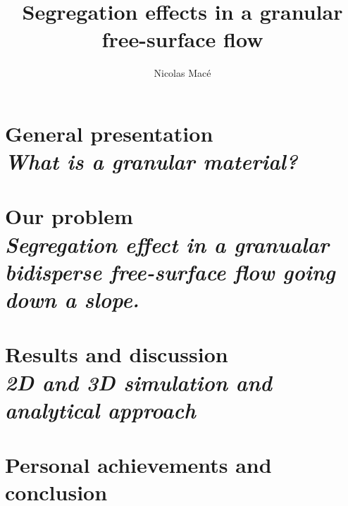 \documentclass[11pt,a4paper]{report}
\author{Nicolas Macé}
\title{Segregation effects in a granular free-surface flow}
\newcommand\Chapter[2]{
  \chapter[#1: {\itshape#2}]{#1\\[2ex]\Large\itshape#2}
}
\begin{document}
\maketitle

\tableofcontents

\Chapter{General presentation}{What is a granular material?}

\Chapter{Our problem}{Segregation effect in a granualar bidisperse free-surface flow going down a slope.}

\Chapter{Results and discussion}{2D and 3D simulation and analytical approach}

\chapter{Personal achievements and conclusion} 
\end{document}

